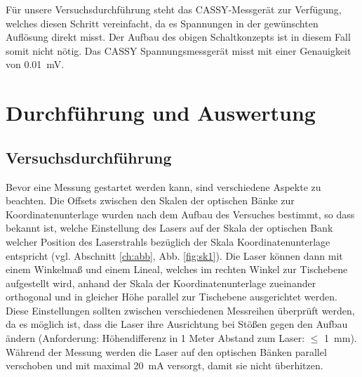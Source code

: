 \documentclass[12pt,a4paper]{article}
\begin{document}
Für unsere Versuchsdurchführung steht das CASSY-Messgerät zur Verfügung, welches diesen Schritt vereinfacht, da es Spannungen in der gewünschten Auflösung direkt misst. Der Aufbau des obigen Schaltkonzepts ist in diesem Fall somit nicht nötig. Das CASSY Spannungsmessgerät misst mit einer Genauigkeit von \SI{0.01}{\milli V}.
\section{Durchführung und Auswertung}
\subsection{Versuchsdurchführung}
\label{sec:versuchsdurchfuhrung}
Bevor eine Messung gestartet werden kann, sind verschiedene Aspekte zu beachten. 
Die Offsets zwischen den Skalen der optischen Bänke zur Koordinatenunterlage wurden nach dem Aufbau des Versuches bestimmt, so dass bekannt ist, welche Einstellung des Lasers auf der Skala der optischen Bank welcher Position des Laserstrahls bezüglich der Skala Koordinatenunterlage entspricht (vgl. Abschnitt \ref{ch:abb}, Abb. \ref{fig:sk1}). Die Laser können dann mit einem Winkelmaß und einem Lineal, welches im rechten Winkel zur Tischebene aufgestellt wird, anhand der Skala der Koordinatenunterlage zueinander orthogonal und in gleicher Höhe parallel zur Tischebene ausgerichtet werden.\\

Diese Einstellungen sollten zwischen verschiedenen Messreihen überprüft werden, da es möglich ist, dass die Laser ihre Ausrichtung bei Stößen gegen den Aufbau ändern (Anforderung: Höhendifferenz in 1 Meter Abstand zum Laser: $\leq$ \SI{1}{\milli \meter}). Während der Messung werden die Laser auf den optischen Bänken parallel verschoben und mit maximal \SI{20}{\milli \ampere} versorgt, damit sie nicht überhitzen.\\
\end{document}

